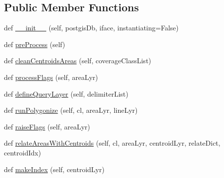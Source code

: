 \subsection*{Public Member Functions}
\begin{DoxyCompactItemize}
\item 
def \mbox{\hyperlink{class_dsg_tools_1_1_validation_tools_1_1_validation_processes_1_1close_earth_coverage_polygons_pcbfc5684de655aabbd7cec48624aa747_ac0b7215dcd8a5405fc76a79d49a1755d}{\+\_\+\+\_\+init\+\_\+\+\_\+}} (self, postgis\+Db, iface, instantiating=False)
\item 
def \mbox{\hyperlink{class_dsg_tools_1_1_validation_tools_1_1_validation_processes_1_1close_earth_coverage_polygons_pcbfc5684de655aabbd7cec48624aa747_ae2dc1713b12a6c716b1fcb8c4c05334b}{pre\+Process}} (self)
\item 
def \mbox{\hyperlink{class_dsg_tools_1_1_validation_tools_1_1_validation_processes_1_1close_earth_coverage_polygons_pcbfc5684de655aabbd7cec48624aa747_a027b2bcde5391fc7f52a80c4e1f0241f}{clean\+Centroids\+Areas}} (self, coverage\+Class\+List)
\item 
def \mbox{\hyperlink{class_dsg_tools_1_1_validation_tools_1_1_validation_processes_1_1close_earth_coverage_polygons_pcbfc5684de655aabbd7cec48624aa747_ac9c3505a899b7cb026f6f19f42a46011}{process\+Flags}} (self, area\+Lyr)
\item 
def \mbox{\hyperlink{class_dsg_tools_1_1_validation_tools_1_1_validation_processes_1_1close_earth_coverage_polygons_pcbfc5684de655aabbd7cec48624aa747_a3527f99ea8c60d1496deb1c42383e2bc}{define\+Query\+Layer}} (self, delimiter\+List)
\item 
def \mbox{\hyperlink{class_dsg_tools_1_1_validation_tools_1_1_validation_processes_1_1close_earth_coverage_polygons_pcbfc5684de655aabbd7cec48624aa747_a0dc6b96d13793375ed2e8f3e2d9e93f2}{run\+Polygonize}} (self, cl, area\+Lyr, line\+Lyr)
\item 
def \mbox{\hyperlink{class_dsg_tools_1_1_validation_tools_1_1_validation_processes_1_1close_earth_coverage_polygons_pcbfc5684de655aabbd7cec48624aa747_ad2878b8cfbcd4ee0ef2c53c2fc11fa73}{raise\+Flags}} (self, area\+Lyr)
\item 
def \mbox{\hyperlink{class_dsg_tools_1_1_validation_tools_1_1_validation_processes_1_1close_earth_coverage_polygons_pcbfc5684de655aabbd7cec48624aa747_a8d869b0d60485f5da3a0eed0f65a27f4}{relate\+Areas\+With\+Centroids}} (self, cl, area\+Lyr, centroid\+Lyr, relate\+Dict, centroid\+Idx)
\item 
def \mbox{\hyperlink{class_dsg_tools_1_1_validation_tools_1_1_validation_processes_1_1close_earth_coverage_polygons_pcbfc5684de655aabbd7cec48624aa747_a2c604ef8852945180b32e74f19336c09}{make\+Index}} (self, centroid\+Lyr)

\end{DoxyCompactItemize}
